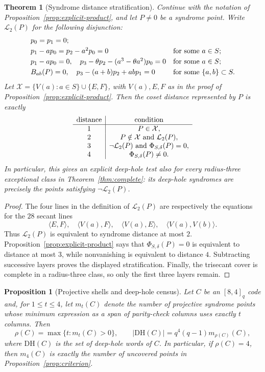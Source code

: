 \documentclass[11pt]{article}
\theoremstyle{plain}
\newtheorem{theorem}{Theorem}
\newtheorem{proposition}{Proposition}
\theoremstyle{definition}
\begin{document}
\begin{theorem}[Syndrome distance stratification]
\label{thm:distance-stratification}
Continue with the notation of Proposition~\ref{prop:explicit-product}, and
let \(P\ne0\) be a syndrome point.  Write \(\mathcal L_2(P)\) for the
following disjunction:
\[
\begin{array}{ll}
p_0=p_1=0; & \\[1mm]
p_1-ap_0=p_2-a^2p_0=0
  &\hbox{for some }a\in S;\\[1mm]
p_1-ap_0=0,\quad
p_3-\theta p_2-(a^3-\theta a^2)p_0=0
  &\hbox{for some }a\in S;\\[1mm]
B_{ab}(P)=0,\quad
p_3-(a+b)p_2+abp_1=0
  &\hbox{for some }\{a,b\}\subset S.
\end{array}
\]
Let \(\mathcal X=\{V(a):a\in S\}\cup\{E,F\}\), with \(V(a),E,F\) as in
the proof of Proposition~\ref{prop:explicit-product}.  Then the coset
distance represented by \(P\) is exactly
\[
\begin{array}{c|c}
\hbox{distance}&\hbox{condition}\\ \hline
1&P\in\mathcal X,\\
2&P\notin\mathcal X\ \hbox{and}\ \mathcal L_2(P),\\
3&\neg\mathcal L_2(P)\ \hbox{and}\ \Phi_{S,\delta}(P)=0,\\
4&\Phi_{S,\delta}(P)\ne0.
\end{array}
\]
In particular, this gives an explicit deep-hole test also for every
radius-three exceptional class in Theorem~\ref{thm:complete}: its deep-hole
syndromes are precisely the points satisfying \(\neg\mathcal L_2(P)\).
\end{theorem}

\begin{proof}
The four lines in the definition of \(\mathcal L_2(P)\) are respectively
the equations for the \(28\) secant lines
\[
 \langle E,F\rangle,\quad
 \langle V(a),F\rangle,\quad
 \langle V(a),E\rangle,\quad
 \langle V(a),V(b)\rangle.
\]
Thus \(\mathcal L_2(P)\) is equivalent to syndrome distance at most \(2\).
Proposition~\ref{prop:explicit-product} says that
\(\Phi_{S,\delta}(P)=0\) is equivalent to distance at most \(3\), while
nonvanishing is equivalent to distance \(4\).  Subtracting successive
layers proves the displayed stratification.  Finally, the trisecant cover is complete in a
radius-three class, so only the first three layers remain.
\end{proof}

\begin{proposition}[Projective shells and deep-hole census]
\label{prop:deep-census}
Let \(C\) be an \([8,4]_q\) code and, for \(1\le t\le4\), let \(m_t(C)\)
denote the number of projective syndrome points whose minimum expression as a
span of parity-check columns uses exactly \(t\) columns.  Then
\[
  \rho(C)=\max\{t:m_t(C)>0\},
  \qquad
  |\mathrm{DH}(C)|=q^4(q-1)m_{\rho(C)}(C),
\]
where \(\mathrm{DH}(C)\) is the set of deep-hole words of \(C\).
In particular, if \(\rho(C)=4\), then \(m_4(C)\) is exactly the number of
uncovered points in Proposition~\ref{prop:criterion}.
\end{proposition}
\end{document}
